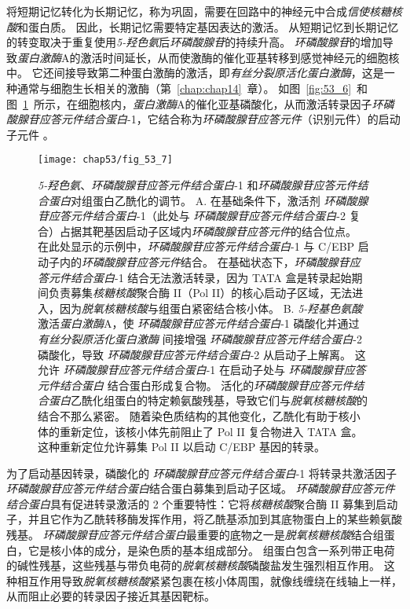 将短期记忆转化为长期记忆，称为巩固，需要在回路中的神经元中合成\textit{信使核糖核酸}和蛋白质。
因此，长期记忆需要特定基因表达的激活。
从短期记忆到长期记忆的转变取决于重复使用\textit{5-羟色氨}后\textit{环磷酸腺苷}的持续升高。
\textit{环磷酸腺苷}的增加导致\textit{蛋白激酶}A的激活时间延长，从而使激酶的催化亚基转移到感觉神经元的细胞核中。
它还间接导致第二种蛋白激酶的激活，即\textit{有丝分裂原活化蛋白激酶}，这是一种通常与细胞生长相关的激酶（第~\ref{chap:chap14}~章）。
如图~\ref{fig:53_6}~和图~\ref{fig:53_7}~所示，在细胞核内，\textit{蛋白激酶}A的催化亚基磷酸化，从而激活转录因子\textit{环磷酸腺苷应答元件结合蛋白}-1，它结合称为\textit{环磷酸腺苷应答元件}（识别元件）的启动子元件 。


\begin{figure}[htbp]
	\centering
	\texttt{[image: chap53/fig\_53\_7]}
	\caption{\textit{5-羟色氨}、\textit{环磷酸腺苷应答元件结合蛋白}-1 和\textit{环磷酸腺苷应答元件结合蛋白}对组蛋白乙酰化的调节。 
		A. 在基础条件下，激活剂 \textit{环磷酸腺苷应答元件结合蛋白}-1（此处与 \textit{环磷酸腺苷应答元件结合蛋白}-2 复合）占据其靶基因启动子区域内\textit{环磷酸腺苷应答元件}的结合位点。
		在此处显示的示例中，\textit{环磷酸腺苷应答元件结合蛋白}-1 与 C/EBP 启动子内的\textit{环磷酸腺苷应答元件}结合。
		在基础状态下，\textit{环磷酸腺苷应答元件结合蛋白}-1 结合无法激活转录，因为 TATA 盒是转录起始期间负责募集\textit{核糖核酸}聚合酶 II（Pol II）的核心启动子区域，无法进入，因为\textit{脱氧核糖核酸}与组蛋白紧密结合核小体。
		B. \textit{5-羟基色氨酸}激活\textit{蛋白激酶}A，使 \textit{环磷酸腺苷应答元件结合蛋白}-1 磷酸化并通过 \textit{有丝分裂原活化蛋白激酶} 间接增强 \textit{环磷酸腺苷应答元件结合蛋白}-2 磷酸化，导致 \textit{环磷酸腺苷应答元件结合蛋白}-2 从启动子上解离。
		这允许 \textit{环磷酸腺苷应答元件结合蛋白}-1 在启动子处与 \textit{环磷酸腺苷应答元件结合蛋白} 结合蛋白形成复合物。
		活化的\textit{环磷酸腺苷应答元件结合蛋白}乙酰化组蛋白的特定赖氨酸残基，导致它们与\textit{脱氧核糖核酸}的结合不那么紧密。
		随着染色质结构的其他变化，乙酰化有助于核小体的重新定位，该核小体先前阻止了 Pol II 复合物进入 TATA 盒。
		这种重新定位允许募集 Pol II 以启动 C/EBP 基因的转录。}
	\label{fig:53_7}
\end{figure}


为了启动基因转录，磷酸化的 \textit{环磷酸腺苷应答元件结合蛋白}-1 将转录共激活因子\textit{环磷酸腺苷应答元件结合蛋白}结合蛋白募集到启动子区域。
\textit{环磷酸腺苷应答元件结合蛋白}具有促进转录激活的 2 个重要特性：它将\textit{核糖核酸}聚合酶 II 募集到启动子，并且它作为乙酰转移酶发挥作用，将乙酰基添加到其底物蛋白上的某些赖氨酸残基。
\textit{环磷酸腺苷应答元件结合蛋白}最重要的底物之一是\textit{脱氧核糖核酸}结合组蛋白，它是核小体的成分，是染色质的基本组成部分。
组蛋白包含一系列带正电荷的碱性残基，这些残基与带负电荷的\textit{脱氧核糖核酸}磷酸盐发生强烈相互作用。
这种相互作用导致\textit{脱氧核糖核酸}紧紧包裹在核小体周围，就像线缠绕在线轴上一样，从而阻止必要的转录因子接近其基因靶标。


